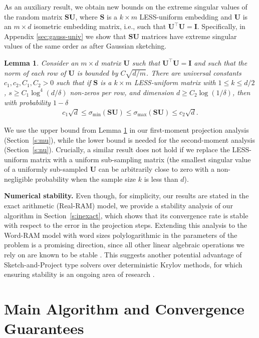 \documentclass[11pt]{article}
\let\origtop\top
\renewcommand\top{{\scriptscriptstyle{\origtop}}}
\def\I{{\mathbf I}}
\def\S{{\mathbf S}}
\def\U{{\mathbf U}}
\newtheorem{lem}[thm]{Lemma}
\begin{document}
As an auxiliary result, we obtain new bounds on the extreme singular values of the random matrix $\S\U$, where $\S$ is a $k\times m$ LESS-uniform embedding and $\U$ is an $m\times d$ isometric embedding matrix, i.e., such that $\U^\top\U=\I$.
Specifically, in Appendix \ref{sec:gauss-univ} we show that $\S\U$ matrices have extreme singular values of the same order as after Gaussian sketching. 
\begin{lem}\label{l:universality}
      Consider an $m\times d$ matrix $\U$ such that $\U^\top\U=\I$ and such that the norm of each row of $\U$ is bounded by $C\sqrt{d/m}$. There are universal constants $c_1,c_2,C_1,C_2>0$ such that if $\S$ is a $k\times m$ LESS-uniform matrix with $1\leq k\leq d/2$, $s\ge C_1\log^4(d/\delta)$ non-zeros per row, and dimension $d\geq C_2\log(1/\delta)$, then with probability $1-\delta$
      \begin{align*}
          c_1\sqrt d\leq \sigma_{\min}(\S\U)\leq \sigma_{\max}(\S\U)\leq c_2 \sqrt d.
      \end{align*}
\end{lem}
\noindent
 We use the upper bound from Lemma \ref{l:universality} in our first-moment projection analysis (Section~\ref{s:mu}), while the lower bound is needed for the second-moment analysis (Section~\ref{s:nu}). Crucially, a similar result does not hold if we replace the LESS-uniform matrix with a uniform sub-sampling matrix (the smallest singular value of a uniformly sub-sampled $\U$ can be arbitrarily close to zero with a non-negligible probability when the sample size $k$ is less than $d$).



\smallskip

\noindent
\textbf{Numerical stability.} Even though, for simplicity, our results are stated in the exact arithmetic (Real-RAM) model, we provide a stability analysis of our algorithm in Section~\ref{s:inexact}, which shows that its convergence rate is stable with respect to the error in the projection steps. 
Extending this analysis to the Word-RAM model with word sizes polylogarithmic in the parameters of the problem is a promising direction, since all other linear algebraic operations we rely on are known to be stable \cite{demmel2007fast}. 
This suggests another potential advantage of Sketch-and-Project type solvers over deterministic Krylov methods, for which ensuring stability is an ongoing area of research \cite{musco2018stability,peng2021solving}.


\section{Main Algorithm and Convergence Guarantees}
\end{document}
